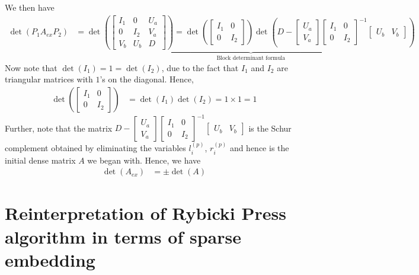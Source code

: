 \documentclass[final,leqno]{siamltex}
\begin{document}
We then have
\begin{align}
\det(P_1A_{ex}P_2) & =
\underbrace{
\det\left(
\begin{bmatrix}
I_1 & 0 & U_a\\
0 & I_2 & V_a\\
V_b & U_b & D
\end{bmatrix}
\right) =
\det\left(
\begin{bmatrix}
I_1 & 0\\
0 & I_2
\end{bmatrix}
\right)
\det\left(D-
\begin{bmatrix}
U_a\\
V_a
\end{bmatrix}
\begin{bmatrix}
I_1 & 0\\
0 & I_2
\end{bmatrix}^{-1}
\begin{bmatrix}
U_b & V_b
\end{bmatrix}
\right)
}_{\text{Block determinant formula}}
\end{align}
Now note that $\det(I_1) = 1 = \det(I_2)$, due to the fact that $I_1$ and $I_2$ are triangular matrices with $1$'s on the diagonal. Hence,
\begin{align}
\det\left(
\begin{bmatrix}
I_1 & 0\\
0 & I_2
\end{bmatrix}
\right) & = \det(I_1) \det(I_2) = 1 \times 1 = 1
\end{align}
Further, note that the matrix $D-
\begin{bmatrix}
U_a\\
V_a
\end{bmatrix}
\begin{bmatrix}
I_1 & 0\\
0 & I_2
\end{bmatrix}^{-1}
\begin{bmatrix}
U_b & V_b
\end{bmatrix}$ is the Schur complement obtained by eliminating the variables $l_i^{(p)}$, $r_i^{(p)}$ and hence is the initial dense matrix $A$ we began with. Hence, we have
\begin{align}
\det(A_{ex}) & = \pm \det(A)
\end{align}
\section{Reinterpretation of Rybicki Press algorithm in terms of sparse embedding}
\end{document}
